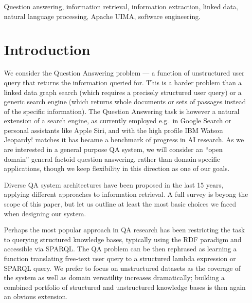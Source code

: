 \documentclass{poster15}
\begin{document}
\begin{keywords}
	Question answering, information retrieval, information extraction,
	linked data, natural language processing, Apache UIMA,
	software engineering.
\end{keywords}


\section{Introduction}

We consider the Question Answering problem --- a function of
unstructured user query that returns the information queried for.
This is a harder problem than a linked data graph search (which requires
a precisely structured user query) or a generic search engine (which
returns whole documents or sets of passages instead of the specific
information).
The Question Answering task is however a natural extension of a search
engine, as currently employed e.g.\ in Google Search \cite{googleKG}
or personal assistants like Apple Siri, and with the high
profile IBM Watson Jeopardy! matches \cite{WatsonOverview}
it has became a benchmark of progress in AI research.
As we are interested in a general purpose QA system, we will consider
an ``open domain'' general factoid question answering, rather than
domain-specific applications, though we keep flexibility in this direction
as one of our goals.

Diverse QA system architectures have been proposed in the last 15 years,
applying different approaches to information retrieval.  A full survey
is beyong the scope of this paper, but let us outline at least the most
basic choices we faced when designing our system.

Perhaps the most popular approach in QA research has been restricting
the task to querying structured knowledge bases, typically using the
RDF paradigm and accessible via SPARQL\@.  The QA problem can
be then rephrased as learning a function translating free-text user query
to a structured lambda expression or SPARQL query. \cite{Semantic2013Berant} \cite{Semantic2014Bordes}
We prefer to focus on unstructured datasets as the coverage of the system
as well as domain versatility increases dramatically; building a combined
portfolio of structured and unstructured knowledge bases
is then again an obvious extension.
\end{document}

